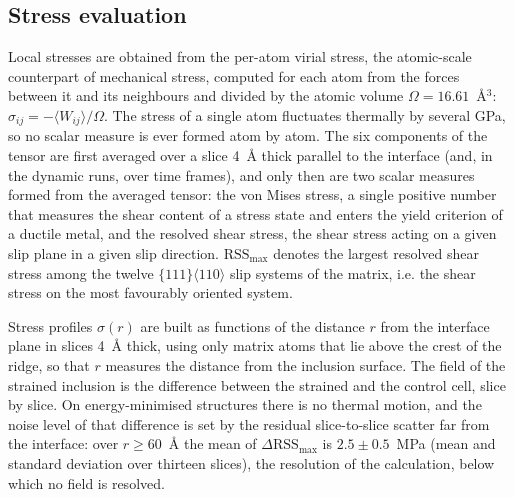 \subsection{Stress evaluation}
\label{sec:stress}

Local stresses are obtained from the per-atom virial stress, the atomic-scale
counterpart of mechanical stress, computed for each atom from the forces
between it and its neighbours and divided by the atomic volume
$\Omega=16.61$~\AA$^{3}$: $\sigma_{ij}=-\langle W_{ij}\rangle/\Omega$. The
stress of a single atom fluctuates thermally by several GPa, so no scalar
measure is ever formed atom by atom. The six components of the tensor are
first averaged over a slice 4~\AA{} thick parallel to the interface (and, in
the dynamic runs, over time frames), and only then are two scalar measures
formed from the averaged tensor: the von Mises stress, a single positive number that measures the shear
content of a stress state and enters the yield criterion of a ductile metal,
and the resolved shear stress,
the shear stress acting on a given slip plane in a given slip direction.
$\mathrm{RSS}_{\max}$ denotes the largest resolved shear stress among the
twelve $\{111\}\langle110\rangle$ slip systems of the matrix, i.e. the shear
stress on the most favourably oriented system.

Stress profiles $\sigma(r)$ are built as functions of the distance $r$ from
the interface plane in slices 4~\AA{} thick, using only matrix atoms that lie
above the crest of the ridge, so that $r$ measures the distance from the
inclusion surface. The field of the strained inclusion is the difference
between the strained and the control cell, slice by slice. On energy-minimised
structures there is no thermal motion, and the noise level of that difference
is set by the residual slice-to-slice scatter far from the interface: over
$r\geq60$~\AA{} the mean of $\Delta\mathrm{RSS}_{\max}$ is $2.5\pm0.5$~MPa
(mean and standard deviation over thirteen slices), the resolution of the
calculation, below which no field is resolved.